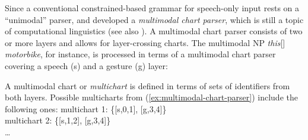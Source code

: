 \documentclass[output=paper]{langsci/langscibook}
\begin{document}
Since a conventional constrained-based grammar for speech-only input rests on a \enquote{unimodal} parser, \citet{Johnston:1998} and \citet{Johnston:et:al:1997} developed a \emph{multimodal chart parser}, which is still a topic of computational linguistics \citep{Alahverdzhieva:Flickinger:Lascarides:2012} (see also ).
%
A multimodal chart parser consists of two or more layers and allows for layer-crossing charts.
%
The multimodal NP \emph{this}[\Pointing] \emph{motorbike}, for instance, is processed in terms of a multimodal chart parser covering a speech (s) and a gesture (g) layer:
%
\ea \label{ex:multimodal-chart-parser}
\z

A multimodal chart or \emph{multichart}  is defined in terms of sets of identifiers from both layers.
%
Possible multicharts from (\ref{ex:multimodal-chart-parser}) include the following ones:
%
\ea
multichart 1: \{[s,0,1], [g,3,4]\} \\
multichart 2: \{[s,1,2], [g,3,4]\} \\
\ldots
\z
{}

\end{document}
